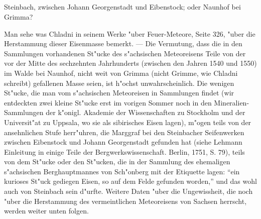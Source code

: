 \documentclass[a4paper, 11pt, oneside, polutonikogreek, german]{article}
\begin{document}
\setlength{\leftskip}{0pt}
\setlength{\parindent}{20pt}

\subsection{}
\begin{center}

Steinbach, zwischen Johann Georgenstadt und Eibenstock; oder Naunhof bei Grimma?
\end{center}

\setlength{\leftskip}{10mm}
\setlength{\parindent}{0pt}

{\footnotesize Man sehe was Chladni in seinem Werke "uber Feuer-Meteore, Seite 326, "uber die Herstammung dieser Eisenmasse bemerkt. --- Die Vermutung, dass die in den Sammlungen vorhandenen St"ucke des s"achsischen Meteoreisens Teile von der vor der Mitte des sechzehnten Jahrhunderts (zwischen den Jahren 1540 und 1550) im Walde bei Naunhof, nicht weit von Grimma (nicht Grimme, wie Chladni schreibt) gefallenen Masse seien, ist h"ochst unwahrscheinlich. Die wenigen St"ucke, die man vom s"achsischen Meteoreisen in Sammlungen findet (wir entdeckten zwei kleine St"ucke erst im vorigen Sommer noch in den Mineralien-Sammlungen der k"onigl. Akademie der Wissenschaften zu Stockholm und der Universit"at zu Uppsala, wo sie als sibirisches Eisen lagen), m"ogen teils von der ansehnlichen Stufe herr"uhren, die Marggraf bei den Steinbacher Seifenwerken zwischen Eibenstock und Johann Georgenstadt gefunden hat (siehe Lehmann Einleitung in einige Teile der Bergwerkswissenschaft. Berlin, 1751, S. 79), teils von dem St"ucke oder den St"ucken, die in der Sammlung des ehemaligen s"achsischen Berghauptmannes von Sch"onberg mit der Etiquette lagen: "`ein kurioses St"uck gediegen Eisen, so auf dem Felde gefunden worden,"' und das wohl auch von Steinbach sein d"urfte. Weitere Daten "uber die Ungewissheit, die noch "uber die Herstammung des vermeintlichen Meteoreisens von Sachsen herrscht, werden weiter unten folgen.}

\setlength{\leftskip}{0pt}
\setlength{\parindent}{20pt}
\end{document}
